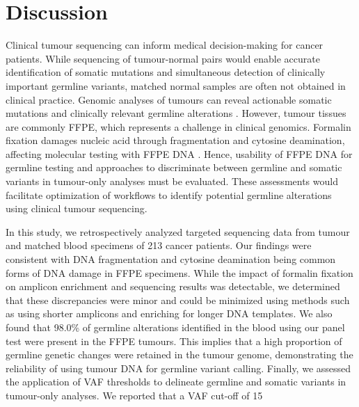 
\chapter{Discussion}
\label{ch:Discussion}

Clinical tumour sequencing can inform medical decision-making for cancer patients. While sequencing of tumour-normal pairs would enable accurate identification of somatic mutations and simultaneous detection of clinically important germline variants, matched normal samples are often not obtained in clinical practice. Genomic analyses of tumours can reveal actionable somatic mutations and clinically relevant germline alterations \cite{Meric-Bernstam2016, Schrader2015, Jones2015a}. However, tumour tissues are commonly FFPE, which represents a challenge in clinical genomics. Formalin fixation damages nucleic acid through fragmentation and cytosine deamination, affecting molecular testing with FFPE DNA \cite{Do2015a, Kim2017, Ofner2017, Oh2015, Wong2013, Wong2014, Sikorsky2007}. Hence, usability of FFPE DNA for germline testing and approaches to discriminate between germline and somatic variants in tumour-only analyses must be evaluated. These assessments would facilitate optimization of workflows to identify potential germline alterations using clinical tumour sequencing.

In this study, we retrospectively analyzed targeted sequencing data from tumour and matched blood specimens of 213 cancer patients. Our findings were consistent with DNA fragmentation and cytosine deamination being common forms of DNA damage in FFPE specimens. While the impact of formalin fixation on amplicon enrichment and sequencing results was detectable, we determined that these discrepancies were minor and could be minimized using methods such as using shorter amplicons and enriching for longer DNA templates. We also found that 98.0\% of germline alterations identified in the blood using our panel test were present in the FFPE tumours. This implies that a high proportion of germline genetic changes were retained in the tumour genome, demonstrating the reliability of using tumour DNA for germline variant calling. Finally, we assessed the application of VAF thresholds to delineate germline and somatic variants in tumour-only analyses. We reported that a VAF cut-off of 15%

